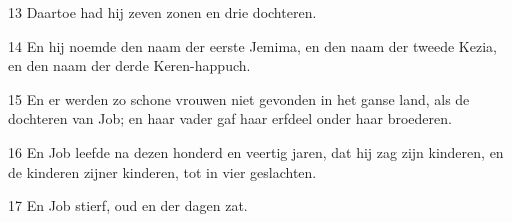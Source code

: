 \par 13 Daartoe had hij zeven zonen en drie dochteren.
\par 14 En hij noemde den naam der eerste Jemima, en den naam der tweede Kezia, en den naam der derde Keren-happuch.
\par 15 En er werden zo schone vrouwen niet gevonden in het ganse land, als de dochteren van Job; en haar vader gaf haar erfdeel onder haar broederen.
\par 16 En Job leefde na dezen honderd en veertig jaren, dat hij zag zijn kinderen, en de kinderen zijner kinderen, tot in vier geslachten.
\par 17 En Job stierf, oud en der dagen zat.



